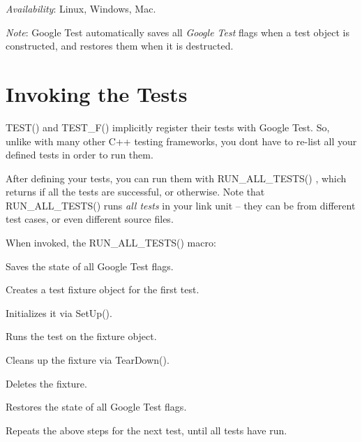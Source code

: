 {\itshape Availability}\+: Linux, Windows, Mac.

{\itshape Note}\+: Google Test automatically saves all {\itshape Google Test} flags when a test object is constructed, and restores them when it is destructed.

\section*{Invoking the Tests}

{\ttfamily T\+E\+S\+T()} and {\ttfamily T\+E\+S\+T\+\_\+\+F()} implicitly register their tests with Google Test. So, unlike with many other C++ testing frameworks, you don\textquotesingle{}t have to re-\/list all your defined tests in order to run them.

After defining your tests, you can run them with {\ttfamily R\+U\+N\+\_\+\+A\+L\+L\+\_\+\+T\+E\+S\+T\+S()} , which returns {} if all the tests are successful, or {} otherwise. Note that {\ttfamily R\+U\+N\+\_\+\+A\+L\+L\+\_\+\+T\+E\+S\+T\+S()} runs {\itshape all tests} in your link unit -- they can be from different test cases, or even different source files.

When invoked, the {\ttfamily R\+U\+N\+\_\+\+A\+L\+L\+\_\+\+T\+E\+S\+T\+S()} macro\+:
\begin{DoxyEnumerate}
\item Saves the state of all Google Test flags.
\end{DoxyEnumerate}
\begin{DoxyEnumerate}
\item Creates a test fixture object for the first test.
\end{DoxyEnumerate}
\begin{DoxyEnumerate}
\item Initializes it via {\ttfamily Set\+Up()}.
\end{DoxyEnumerate}
\begin{DoxyEnumerate}
\item Runs the test on the fixture object.
\end{DoxyEnumerate}
\begin{DoxyEnumerate}
\item Cleans up the fixture via {\ttfamily Tear\+Down()}.
\end{DoxyEnumerate}
\begin{DoxyEnumerate}
\item Deletes the fixture.
\end{DoxyEnumerate}
\begin{DoxyEnumerate}
\item Restores the state of all Google Test flags.
\end{DoxyEnumerate}
\begin{DoxyEnumerate}
\item Repeats the above steps for the next test, until all tests have run.
\end{DoxyEnumerate}

